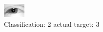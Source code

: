 \begin{figure}[h!]
\begin{center}
\includegraphics[width=0.60\columnwidth]{figures/ID2379_class_2_target_3.png}
\end{center}
\caption{ Classification: 2 actual target: 3}
\label{fig:ID2379_class_2_target_3}
\end{figure}
